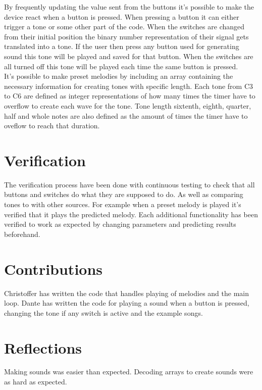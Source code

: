 \documentclass[a4paper]{article}
\begin{document}
By frequently updating the value sent from the buttons it's possible to make the device react when a button is pressed. When pressing a button it can either trigger a tone or some other part of the code. When the switches are changed from their initial position the binary number representation of their signal gets translated into a tone. If the user then press any button used for generating sound this tone will be played and saved for that button. When the switches are all turned off this tone will be played each time the same button is pressed.\\

It's possible to make preset melodies by including an array containing the necessary information for creating tones with specific length. Each tone from C3 to C6 are defined as integer representations of how many times the timer have to overflow to create each wave for the tone. Tone length sixtenth, eighth, quarter, half and whole notes are also defined as the amount of times the timer have to oveflow to reach that duration.

\section{Verification}

The verification process have been done with continuous testing to check that all buttons and switches do what they are supposed to do. As well as comparing tones to with other sources. For example when a preset melody is played it's verified that it plays the predicted melody. Each additional functionality has been verified to work as expected by changing parameters and predicting results beforehand.

\section{Contributions}
Christoffer has written the code that handles playing of melodies and the main loop. Dante has written the code for playing a sound when a button is pressed, changing the tone if any switch is active and the example songs.

\section{Reflections}
Making sounds was easier than expected. Decoding arrays to create sounds were as hard as expected.
\end{document}
